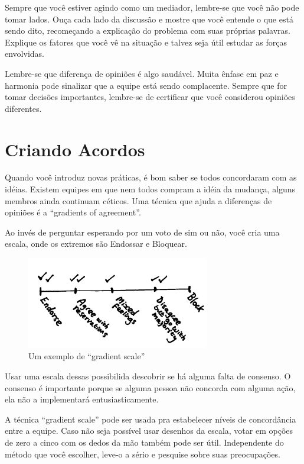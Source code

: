 \documentclass[a4paper, 10pt, font=plain]{abnt}
\begin{document}
Sempre que você estiver agindo como um mediador, lembre-se que você não pode tomar lados. Ouça cada lado da discussão e mostre que você entende o que está sendo dito, recomeçando a explicação do problema com suas próprias palavras. Explique os fatores que você vê na situação e talvez seja útil estudar as forças envolvidas.

Lembre-se que diferença de opiniões é algo saudável. Muita ênfase em paz e harmonia pode sinalizar que a equipe está sendo complacente. Sempre que for tomar decisões importantes, lembre-se de certificar que você considerou opiniões diferentes.



\section{Criando Acordos}
Quando você introduz novas práticas, é bom saber se todos concordaram com as idéias. Existem equipes em que nem todos compram a idéia da mudança, alguns membros ainda continuam céticos. Uma técnica que ajuda a diferenças de opiniões é a ``gradients of agreement''.

Ao invés de perguntar esperando por um voto de sim ou não, você cria uma escala, onde os extremos são Endossar e Bloquear.

\begin{figure}[h]
    \centering
    \includegraphics[width=8cm]{gradient_scale}
    \caption{Um exemplo de ``gradient scale''}
\end{figure}

Usar uma escala dessas possibilida descobrir se há alguma falta de consenso. O consenso é importante porque se alguma pessoa não concorda com alguma ação, ela não a implementará entusiasticamente.

A técnica ``gradient scale'' pode ser usada pra estabelecer níveis de concordância entre a equipe. Caso não seja possível usar desenhos da escala, votar em opções de zero a cinco com os dedos da mão também pode ser útil. Independente do método que você escolher, leve-o a sério e pesquise sobre suas preocupações.
\end{document}
